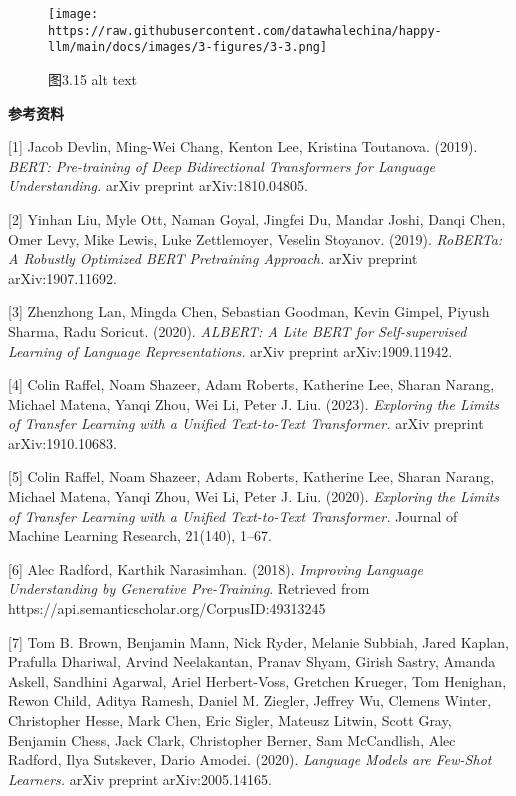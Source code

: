 \documentclass[
]{article}
\begin{document}
\begin{figure}[htbp]\centering
\texttt{[image: https://raw.githubusercontent.com/datawhalechina/happy-llm/main/docs/images/3-figures/3-3.png]}
\caption{图3.15 alt text}
\end{figure}

\textbf{参考资料}

{[}1{]} Jacob Devlin, Ming-Wei Chang, Kenton Lee, Kristina Toutanova.
(2019). \emph{BERT: Pre-training of Deep Bidirectional Transformers for
Language Understanding.} arXiv preprint arXiv:1810.04805.

{[}2{]} Yinhan Liu, Myle Ott, Naman Goyal, Jingfei Du, Mandar Joshi,
Danqi Chen, Omer Levy, Mike Lewis, Luke Zettlemoyer, Veselin Stoyanov.
(2019). \emph{RoBERTa: A Robustly Optimized BERT Pretraining Approach.}
arXiv preprint arXiv:1907.11692.

{[}3{]} Zhenzhong Lan, Mingda Chen, Sebastian Goodman, Kevin Gimpel,
Piyush Sharma, Radu Soricut. (2020). \emph{ALBERT: A Lite BERT for
Self-supervised Learning of Language Representations.} arXiv preprint
arXiv:1909.11942.

{[}4{]} Colin Raffel, Noam Shazeer, Adam Roberts, Katherine Lee, Sharan
Narang, Michael Matena, Yanqi Zhou, Wei Li, Peter J. Liu. (2023).
\emph{Exploring the Limits of Transfer Learning with a Unified
Text-to-Text Transformer.} arXiv preprint arXiv:1910.10683.

{[}5{]} Colin Raffel, Noam Shazeer, Adam Roberts, Katherine Lee, Sharan
Narang, Michael Matena, Yanqi Zhou, Wei Li, Peter J. Liu. (2020).
\emph{Exploring the Limits of Transfer Learning with a Unified
Text-to-Text Transformer.} Journal of Machine Learning Research,
21(140), 1--67.

{[}6{]} Alec Radford, Karthik Narasimhan. (2018). \emph{Improving
Language Understanding by Generative Pre-Training}. Retrieved from
https://api.semanticscholar.org/CorpusID:49313245

{[}7{]} Tom B. Brown, Benjamin Mann, Nick Ryder, Melanie Subbiah, Jared
Kaplan, Prafulla Dhariwal, Arvind Neelakantan, Pranav Shyam, Girish
Sastry, Amanda Askell, Sandhini Agarwal, Ariel Herbert-Voss, Gretchen
Krueger, Tom Henighan, Rewon Child, Aditya Ramesh, Daniel M. Ziegler,
Jeffrey Wu, Clemens Winter, Christopher Hesse, Mark Chen, Eric Sigler,
Mateusz Litwin, Scott Gray, Benjamin Chess, Jack Clark, Christopher
Berner, Sam McCandlish, Alec Radford, Ilya Sutskever, Dario Amodei.
(2020). \emph{Language Models are Few-Shot Learners.} arXiv preprint
arXiv:2005.14165.
\end{document}
